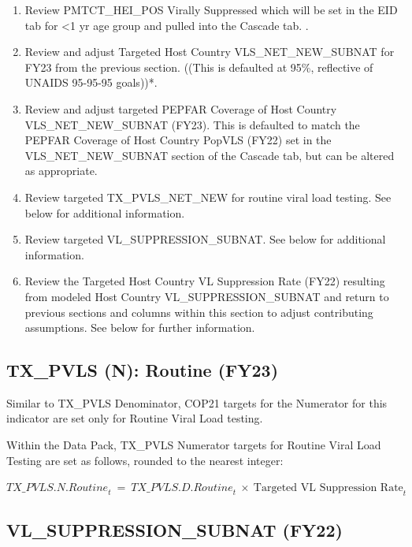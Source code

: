 \documentclass[
  openany]{book}
\begin{document}
\begin{enumerate}
\def\labelenumi{\arabic{enumi}.}
\item
  Review PMTCT\_HEI\_POS Virally Suppressed which will be set in the EID
  tab for \textless1 yr age group and pulled into the Cascade tab. .
\item
  Review and adjust Targeted Host Country VLS\_NET\_NEW\_SUBNAT for FY23
  from the previous section. ((This is defaulted at 95\%, reflective of
  UNAIDS 95-95-95 goals))*.
\item
  Review and adjust targeted PEPFAR Coverage of Host Country
  VLS\_NET\_NEW\_SUBNAT (FY23). This is defaulted to match the PEPFAR
  Coverage of Host Country PopVLS (FY22) set in the VLS\_NET\_NEW\_SUBNAT
  section of the Cascade tab, but can be altered as appropriate.
\item
  Review targeted TX\_PVLS\_NET\_NEW for routine viral load testing. See
  below for additional information.
\item
  Review targeted VL\_SUPPRESSION\_SUBNAT. See below for additional
  information.
\item
  Review the Targeted Host Country VL Suppression Rate (FY22)
  resulting from modeled Host Country VL\_SUPPRESSION\_SUBNAT and return
  to previous sections and columns within this section to adjust
  contributing assumptions. See below for further information.
\end{enumerate}

\hypertarget{tx_pvls-n-routine-fy23}{%
\subsection{TX\_PVLS (N): Routine (FY23)}\label{tx_pvls-n-routine-fy23}}

Similar to TX\_PVLS Denominator, COP21 targets for the Numerator for this
indicator are set only for Routine Viral Load testing.

Within the Data Pack, TX\_PVLS Numerator targets for Routine Viral Load
Testing are set as follows, rounded to the nearest integer:

\begin{center} ${TX\_ PVLS.N.Routine}_{t}\  = \ {TX\_ PVLS.D.Routine}_{t}\  \times \ \text{Targeted\ VL\ Suppression\ Rate}_{t}$ \end{center}

\hypertarget{vl_suppression_subnat-fy22}{%
\subsection{VL\_SUPPRESSION\_SUBNAT (FY22)}\label{vl_suppression_subnat-fy22}}
\end{document}
